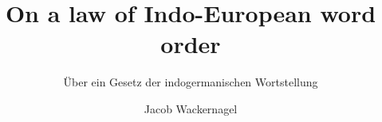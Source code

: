 \author{Jacob Wackernagel}
\title{On a law of Indo-European word order}
\subtitle{Über ein Gesetz der indogermanischen Wortstellung}
\renewcommand{\lsSeries}{classics}
\renewcommand{\lsSeriesNumber}{7}

